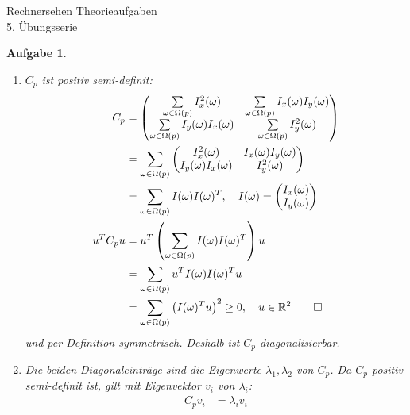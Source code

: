 \documentclass[11pt]{article}
\theoremstyle{break}
\newtheorem{task}{Aufgabe}
\newcommand{\hw}{5}
\begin{document}
\begin{center}
    \Large{Rechnersehen Theorieaufgaben}\\
    \large{\hw. Übungsserie}
\end{center}
\begin{task}
    \hfill\vspace{-5mm}
    \begin{enumerate}[label={\alph*)}]
        \item $C_p$ ist positiv semi-definit:
        \begin{align*}
            C_p &= \begin{pmatrix}
                \sum\limits_{\omega \in \Omega(p)} I^2_x (\omega) & \sum\limits_{\omega \in \Omega(p)} I_x (\omega) I_y (\omega)\\
                \sum\limits_{\omega \in \Omega(p)} I_y (\omega) I_x (\omega) & \sum\limits_{\omega \in \Omega(p)} I^2_y (\omega)
            \end{pmatrix}\\
            &= \sum\limits_{\omega \in \Omega(p)} \begin{pmatrix}
                I^2_x (\omega) & I_x (\omega) I_y (\omega)\\
                I_y (\omega) I_x (\omega) & I^2_y (\omega)
            \end{pmatrix}\\
            &= \sum\limits_{\omega \in \Omega(p)} I(\omega) I(\omega)^T,\quad I(\omega) = \begin{pmatrix}
                I_x(\omega)\\
                I_y(\omega)
            \end{pmatrix}\\
            u^T C_p u &= u^T \left( \sum\limits_{\omega \in \Omega(p)} I(\omega) I(\omega)^T \right) u\\
            &= \sum\limits_{\omega \in \Omega(p)} u^T I(\omega) I(\omega)^T u\\
            &= \sum\limits_{\omega \in \Omega(p)} \left(I(\omega)^T u\right)^2 \geq 0,\quad u \in \mathbb{R}^2 \qed
        \end{align*}
        und per Definition symmetrisch. Deshalb ist $C_p$ diagonalisierbar.
        \item Die beiden Diagonaleinträge sind die Eigenwerte $\lambda_1, \lambda_2$ von $C_p$. Da $C_p$ positiv semi-definit ist, gilt mit Eigenvektor $v_i$ von $\lambda_i$:
        \begin{align*}
            C_p v_i &= \lambda_i v_i\\

\end{align*}
\end{enumerate}
\end{task}
\end{document}
